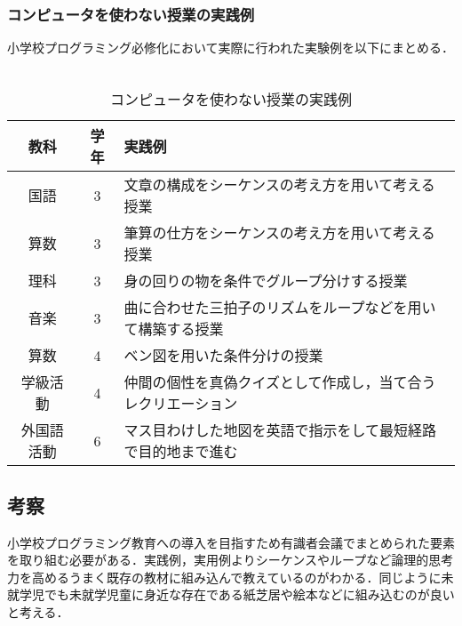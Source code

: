 \subsubsection{コンピュータを使わない授業の実践例}
小学校プログラミング必修化において実際に行われた実験例\cite{con}を以下にまとめる．\\
\\
\begin{table}[htb]
\begin{center}
\centering
    \caption{コンピュータを使わない授業の実践例}
  \begin{tabular}{|c|c|l|} \hline
    教科& 学年&実践例 \\ \hline
    国語& 3&文章の構成をシーケンスの考え方を用いて考える授業\\ \hline
    算数& 3&筆算の仕方をシーケンスの考え方を用いて考える授業\\ \hline
    理科& 3&身の回りの物を条件でグループ分けする授業\\ \hline
    音楽& 3&曲に合わせた三拍子のリズムをループなどを用いて構築する授業\\ \hline
    算数& 4&ベン図を用いた条件分けの授業\\ \hline
    学級活動& 4&仲間の個性を真偽クイズとして作成し，当て合うレクリエーション\\ \hline
    外国語活動& 6&マス目わけした地図を英語で指示をして最短経路で目的地まで進む\\ \hline
   
  \end{tabular}
  \label{tab:bamen1}
  \end{center}
\end{table}

\subsection{考察}
小学校プログラミング教育への導入を目指すため有識者会議でまとめられた要素を取り組む必要がある．実践例，実用例よりシーケンスやループなど論理的思考力を高めるうまく既存の教材に組み込んで教えているのがわかる．同じように未就学児でも未就学児童に身近な存在である紙芝居や絵本などに組み込むのが良いと考える．




